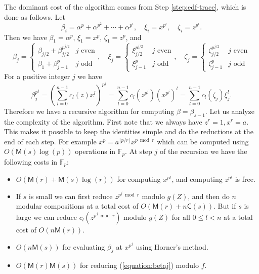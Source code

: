 \documentclass[12pt]{article}
\theoremstyle{plain}
\theoremstyle{definition}
\def\F{\mathbb{F}}
\def\M{\mathsf{M}}
\def\CC{\mathsf{C}}
\newcounter{algorithm}
\begin{document}
The dominant cost of the algorithm comes from Step \ref{step:edf-trace}, which is done as follows. Let
\[ \beta_i = \alpha^p + \alpha^{p^2} + \cdots + \alpha^{p^i}, \quad \xi_i = x^{p^i}, \quad \zeta_i = z^{p^i}. \]
Then we have $\beta_1 = \alpha^p$, $\xi_1 = x^p$, $\zeta_1 = z^p$, and
\[
\beta_j = 
\begin{cases}
	\beta_{j / 2} + \beta_{j / 2}^{p^{j / 2}} & j \text{ even} \\
	\beta_1 + \beta_{j - 1}^p & j \text{ odd}
\end{cases}, \quad
\xi_j = 
\begin{cases}
	\xi_{j / 2}^{p^{j / 2}} & j \text{ even} \\
	\xi_{j - 1}^p & j \text{ odd}
\end{cases}, \quad
\zeta_j = 
\begin{cases}
	\zeta_{j / 2}^{p^{j / 2}} & j \text{ even} \\
	\zeta_{j - 1}^p & j \text{ odd}
\end{cases}
\]
For a positive integer $j$ we have
\begin{equation}
\label{equation:betaj}
	\beta_j^{p^j} = \left( \sum_{l = 0}^{n - 1}c_l(z)x^l \right)^{p^j} = \sum_{l = 0}^{n - 1}c_l(z^{p^j})(x^{p^j})^l = \sum_{l = 0}^{n - 1}c_l(\zeta_j)\xi_j^l.
\end{equation}
Therefore we have a recursive algorithm for computing $\beta = \beta_{s - 1}$. Let us analyze the complexity of the algorithm. First note that we always have $z^r = 1, x^r = a$. This makes it possible to keep the identities simple and do the reductions at the end of each step. For example $x^p = a^{\lfloor p / r\rfloor}x^{p \bmod r}$ which can be computed using $O(\M(s)\log(p))$ operations in $\F_p$. At step $j$ of the recursion we have the following costs in $\F_p$:
\begin{itemize}
	\item $O(\M(r) + \M(s)\log(r))$ for computing $x^{p^j}$, and computing $z^{p^j}$ is free.
	\item If $s$ is small we can first reduce $z^{p^j \bmod r}$ modulo $g(Z)$, and then do $n$ modular compositions at a total cost of $O(\M(r) + n\CC(s))$. But if $s$ is large we can reduce $c_l(z^{p^j \bmod r})$ modulo $g(Z)$ for all $0 \le l < n$ at a total cost of $O(n\M(r))$.
	\item $O(n\M(s))$ for evaluating $\beta_j$ at $x^{p^j}$ using Horner's method.
	\item $O(\M(r)\M(s))$ for reducing (\ref{equation:betaj}) modulo $f$.
\end{itemize}
\end{document}
